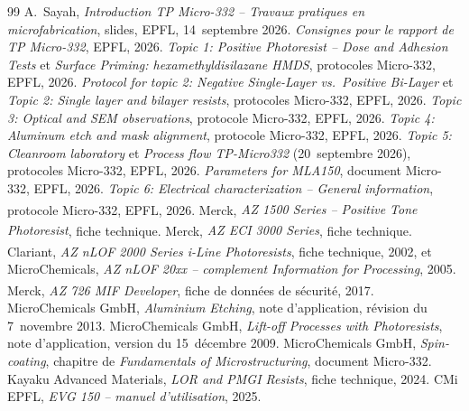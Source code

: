 \clearpage
\renewcommand{\refname}{Références}
{}
\begin{thebibliography}{99}
   A.~Sayah, \emph{Introduction TP Micro-332 -- Travaux pratiques en microfabrication}, slides, EPFL, 14~septembre 2026.
   \emph{Consignes pour le rapport de TP Micro-332}, EPFL, 2026.
   \emph{Topic 1: Positive Photoresist -- Dose and Adhesion Tests} et \emph{Surface Priming: hexamethyldisilazane HMDS}, protocoles Micro-332, EPFL, 2026.
   \emph{Protocol for topic 2: Negative Single-Layer vs.\ Positive Bi-Layer} et \emph{Topic 2: Single layer and bilayer resists}, protocoles Micro-332, EPFL, 2026.
   \emph{Topic 3: Optical and SEM observations}, protocole Micro-332, EPFL, 2026.
   \emph{Topic 4: Aluminum etch and mask alignment}, protocole Micro-332, EPFL, 2026.
   \emph{Topic 5: Cleanroom laboratory} et \emph{Process flow TP-Micro332} (20~septembre 2026), protocoles Micro-332, EPFL, 2026.
   \emph{Parameters for MLA150}, document Micro-332, EPFL, 2026.
   \emph{Topic 6: Electrical characterization -- General information}, protocole Micro-332, EPFL, 2026.
   Merck, \emph{AZ\textsuperscript{\textregistered} 1500 Series -- Positive Tone Photoresist}, fiche technique.
   Merck, \emph{AZ\textsuperscript{\textregistered} ECI 3000 Series}, fiche technique.
   Clariant, \emph{AZ\textsuperscript{\textregistered} nLOF 2000 Series i-Line Photoresists}, fiche technique, 2002, et MicroChemicals, \emph{AZ nLOF 20xx -- complement Information for Processing}, 2005.
   Merck, \emph{AZ\textsuperscript{\textregistered} 726 MIF Developer}, fiche de données de sécurité, 2017.
   MicroChemicals GmbH, \emph{Aluminium Etching}, note d'application, révision du 7~novembre 2013.
   MicroChemicals GmbH, \emph{Lift-off Processes with Photoresists}, note d'application, version du 15~décembre 2009.
   MicroChemicals GmbH, \emph{Spin-coating}, chapitre de \emph{Fundamentals of Microstructuring}, document Micro-332.
   Kayaku Advanced Materials, \emph{LOR and PMGI Resists}, fiche technique, 2024.
   CMi EPFL, \emph{EVG 150 -- manuel d'utilisation}, 2025.

\end{thebibliography}
